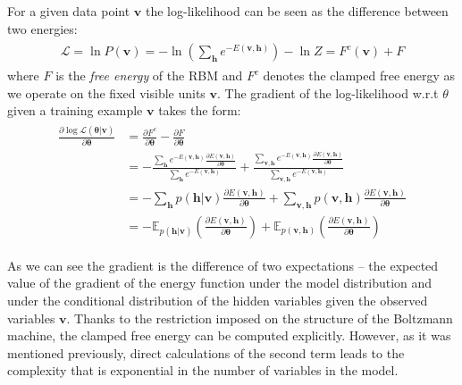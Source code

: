 For a given data point $\mathbf{v}$ the log-likelihood can be seen as the difference between two energies:
\begin{align}
\begin{split}
\mathcal{L} = \ln P(\mathbf{v}) = -\ln (\sum_{\mathbf{h}} e^{-E(\mathbf{v,h})} ) -\ln Z = F^c(\mathbf{v}) + F
\end{split}
\label{eq:loglikelihood}
\end{align}
where $F$ is the \emph{free energy} of the RBM and $F^c$ denotes the clamped free energy as we operate on the fixed visible units $\mathbf{v}$. The gradient of the log-likelihood w.r.t $\theta$ given a training example $\mathbf{v}$ takes the form:
\begin{align}
\begin{split}
\frac{\partial \log \mathcal{L}(\mathbf{\theta  | \mathbf{v}})}{\partial \mathbf{\theta}} & = \frac{\partial F^c }{\partial \mathbf{\theta}} - \frac{\partial F }{\partial \mathbf{\theta}} \\
& = - \frac{\sum_{\mathbf{h}} e^{-E(\mathbf{v,h})} \frac{\partial E(\mathbf{v,h})}{\partial \mathbf{\theta}}}{\sum_{\mathbf{h}} e^{-E(\mathbf{v,h})}} + \frac{\sum_{\mathbf{v, h}} e^{-E(\mathbf{v,h})} \frac{\partial E(\mathbf{v,h})}{\partial \mathbf{\theta}}}{\sum_{\mathbf{v, h}} e^{-E(\mathbf{v,h})}} \\
& = - \sum_\mathbf{h} p(\mathbf{h} | \mathbf{v}) \frac{\partial E(\mathbf{v,h})}{\partial \mathbf{\theta}} +  \sum_\mathbf{v, h} p(\mathbf{v}, \mathbf{h}) \frac{\partial E(\mathbf{v,h})}{\partial \mathbf{\theta}} \\
& =  - \mathbb{E}_{p(\mathbf{h} | \mathbf{v})} \left( \frac{\partial E(\mathbf{v,h})}{\partial \mathbf{\theta}} \right) + \mathbb{E}_{ p(\mathbf{v,h}) } \left( \frac{\partial E(\mathbf{v,h})}{\partial \mathbf{\theta}} \right)
\label{eq:gradient}
\end{split}
\end{align}

As we can see the gradient is the difference of two expectations -- the expected value of the gradient of the energy function under the model distribution and under the conditional distribution of the hidden variables given the observed variables $\mathbf{v}$. Thanks to the restriction imposed on the structure of the Boltzmann machine, the clamped free energy can be computed explicitly. However, as it was mentioned previously, direct calculations of the second term leads to the complexity that is exponential in the number of variables in the model.

